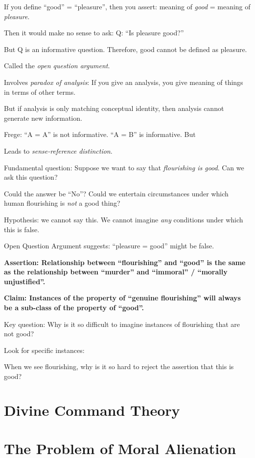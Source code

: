 \documentclass[
]{book}
\begin{document}
If you define ``good'' = ``pleasure'', then you assert: meaning of \emph{good} = meaning of \emph{pleasure}.

Then it would make no sense to ask:
Q: ``Is pleasure good?''

But Q is an informative question.
Therefore, good cannot be defined as pleasure.

Called the \emph{open question argument}.

Involves \emph{paradox of analysis}: If you give an analysis, you give meaning of things in terms of other terms.

But if analysis is only matching conceptual identity, then analysis cannot generate new information.

Frege: ``A = A'' is not informative. ``A = B'' is informative. But

Leads to \emph{sense-reference distinction}.

Fundamental question:
Suppose we want to say that \emph{flourishing is good}.
Can we ask this question?

Could the answer be ``No''?
Could we entertain circumstances under which human flourishing is \emph{not} a good thing?

Hypothesis: we cannot say this.
We cannot imagine \emph{any} conditions under which this is false.

Open Question Argument suggests: ``pleasure = good'' might be false.

\textbf{Assertion: Relationship between ``flourishing'' and ``good'' is the same as the relationship between ``murder'' and ``immoral'' / ``morally unjustified''.}

\textbf{Claim: Instances of the property of ``genuine flourishing'' will always be a sub-class of the property of ``good''.}

Key question: Why is it so difficult to imagine instances of flourishing that are not good?

Look for specific instances:

When we see flourishing, why is it so hard to reject the assertion that this is good?

\hypertarget{divine-command-theory}{%
\section{Divine Command Theory}\label{divine-command-theory}}

\hypertarget{the-problem-of-moral-alienation}{%
\section{The Problem of Moral Alienation}\label{the-problem-of-moral-alienation}}
\end{document}
